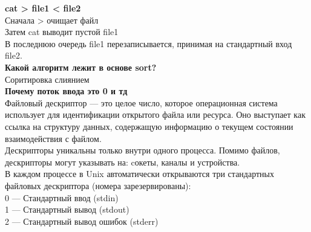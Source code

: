 \noindent \textbf{cat > file1 < file2} \\
Сначала > очищает файл \\
Затем cat выводит пустой file1 \\
В последнюю очередь file1 перезаписывается, принимая на стандартный вход file2. \\

\noindent \textbf{Какой алгоритм лежит в основе sort?} \\
Соритировка слиянием \\

\noindent \textbf{Почему поток ввода это 0 и тд} \\
Файловый дескриптор — это целое число, которое операционная система использует для идентификации открытого файла или ресурса. Оно выступает как ссылка на структуру данных, содержащую информацию о текущем состоянии взаимодействия с файлом. \\
Дескрипторы уникальны только внутри одного процесса.
Помимо файлов, дескрипторы могут указывать на: cокеты, каналы и  устройства. \\
В каждом процессе в Unix автоматически открываются три стандартных файловых дескриптора (номера зарезервированы): \\
0 — Стандартный ввод (stdin) \\ 
1 — Стандартный вывод (stdout) \\
2 — Стандартный вывод ошибок (stderr) 
